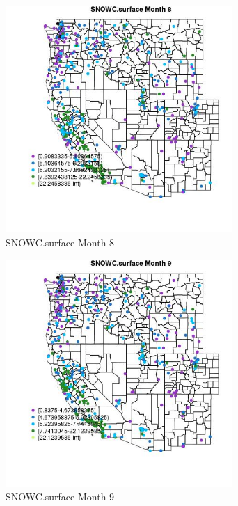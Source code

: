 \clearpage 

\begin{figure} 
\centering  
\includegraphics[width=0.77\textwidth]{Code_Outputs/ML_input_report_ML_input_PM25_Step5_part_d_de_duplicated_aves_ML_input_MapObsMo8SNOWCsurface.jpg} 
\caption{\label{fig:ML_input_report_ML_input_PM25_Step5_part_d_de_duplicated_aves_ML_inputMapObsMo8SNOWCsurface}SNOWC.surface Month 8} 
\end{figure} 
 

\begin{figure} 
\centering  
\includegraphics[width=0.77\textwidth]{Code_Outputs/ML_input_report_ML_input_PM25_Step5_part_d_de_duplicated_aves_ML_input_MapObsMo9SNOWCsurface.jpg} 
\caption{\label{fig:ML_input_report_ML_input_PM25_Step5_part_d_de_duplicated_aves_ML_inputMapObsMo9SNOWCsurface}SNOWC.surface Month 9} 
\end{figure} 
 

